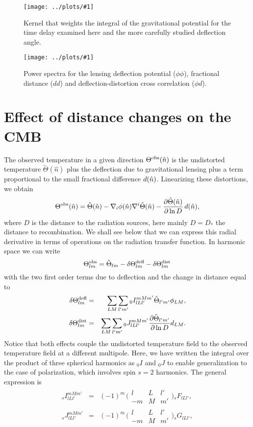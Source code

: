 \documentclass[prd,amsmath,amssymb,floatfix,superscriptaddress,nofootinbib,twocolumn]{revtex4-1}
\def\be{\begin{equation}}
\def\ee{\end{equation}}
\def\bea{\begin{eqnarray}}
\def\eea{\end{eqnarray}}
\newcommand{\eql}[1]{\label{eq:#1}}
\newcommand{\sfig}[2]{
\texttt{[image: ../plots/\#1]}
        }
\newcommand{\Sfig}[2]{
   \begin{figure}[thbp]
   \begin{center}
    \sfig{#1.pdf}{\columnwidth}
    \caption{{\small #2}}
    \label{fig:#1}
     \end{center}
   \end{figure}
}
\newcommand{\scott}[1]{{\color{darkgreen} #1}}
\begin{document}
\Sfig{kernel}{Kernel that weights the integral of the gravitational potential for the time delay examined here and the more carefully studied deflection angle.}
\Sfig{Spectrum}{Power spectra for the lensing deflection potential
($\phi\phi$), fractional distance ($dd$) and deflection-distortion cross correlation
($\phi d$). }


\section{Effect of distance changes on the CMB}
\newcommand\dtl{\delta\Theta^{\rm defl}}
\newcommand\dtd{\delta\Theta^{\rm dist}}
\newcommand\tob{\Theta^{\rm obs}}
\newcommand\tu{\tilde{\Theta}}
\newcommand\td{\Theta^{\rm dist}}
The %
observed temperature in a given direction $\tob(\hat n)$ is the undistorted temperature $\tu(\hat n)$ plus the deflection due to gravitational lensing plus a term proportional to the small fractional difference $d(\hat n)$.  Linearizing these distortions, we obtain
\be
\tob(\hat n) = \tu(\hat n) - \nabla_{i} \phi(\hat n) \nabla^{i}\tu(\hat n) - \frac{\partial\tu(\hat n)}{\partial \ln D}\, \fd(\hat n),
\ee
where $D$ is the distance to the radiation sources, here mainly $D=D_*$ the distance 
to recombination.  We shall see below that we can express this radial derivative in
terms of operations on the radiation transfer function.
In harmonic space we can write
\be
\tob_{lm} = \tu_{lm} -\dtl_{lm}- \dtd_{lm}
\ee
with the two first order terms due to deflection and the change in distance equal to
\bea
\dtl_{lm} &=& \sum_{LM}\sum_{l'm'}{}_{0}I_{lLl'}^{mMm'}\tu_{l'm'}\phi_{LM},\nonumber\\
\dtd_{lm} &=& \sum_{LM}\sum_{l'm'} {}_{0} J_{lLl'}^{mMm'}\frac{\partial \tu_{l'm'}}{\partial \ln D}d_{LM}\eql{dtd}
.\eea
Notice that both effects couple the undistorted temperature field to the observed
temperature field at a different multipole.
Here, we have written the integral over the product of three spherical harmonics as $_0I$ and $_0J$ to enable generalization to the case of polarization, which involves spin $s=2$ harmonics. The general expression is  
\bea
\eql{FG}
{}_{s}I_{lLl'}^{mMm'}  &=& (-1)^m\,
\bigl(\begin{smallmatrix} l & L & l' \\ -m & M & m'  \end{smallmatrix}\bigr) {}_{s}F_{lLl'}, \\
{}_{s}J_{lLl'}^{mMm'}  &=& (-1)^m\,
\bigl(\begin{smallmatrix} l & L & l' \\ -m & M & m'  \end{smallmatrix}\bigr) {}_{s}G_{lLl'}, \nonumber
\eea
\end{document}
